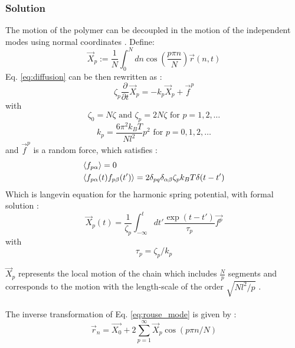 \documentclass[
    paper=A4,pagesize=automedia,fontsize=12pt,
    BCOR=15mm,DIV=22,
    twoside,headinclude,footinclude=false,
    ngerman,fleqn,             %
    bibliography=totocnumbered,          %
    listof=totoc,                %
    listof=flat,                 %
    cleardoublepage=empty      %
    numbers=endperiod
]{scrartcl}
\begin{document}
\subsubsection{Solution}
The motion of the polymer can be decoupled in the motion of the independent modes using normal
coordinates \cite{Doi_Edwards_PD:1994}. Define:
\begin{equation}
    \label{eq:rouse_mode}
    \vec{X}_p := \frac{1}{N} \int_0^N dn \cos(\frac{p \pi n}{N})\vec{r}(n, t)
\end{equation}
Eq. \ref{eq:diffusion} can be then rewritten as \cite{Doi_Edwards_PD:1994}:
\begin{equation}
    \zeta_p \frac{\partial}{\partial t} \vec{X}_p = -k_p \vec{X}_p + \vec{f}^p
\end{equation}
with 
\begin{equation}
    \zeta_0 = N \zeta
    \text{ and }
    \zeta_p = 2 N \zeta
    \text{ for } p = 1,2,\ldots
\end{equation}
\begin{equation}
    k_p = \frac{6 \pi^2 k_B T}{Nl^2} p^2
    \text{ for } p = 0,1,2,\ldots
\end{equation}
and $\vec{f}^p$ is a random force, which satisfies \cite{Doi_Edwards_PD:1994}:
\begin{equation}
    \begin{aligned}
        & \langle f_{p\alpha}\rangle = 0\\
        & \langle f_{p\alpha}(t) f_{p\beta}(t')\rangle = 2 \delta_{pq} \delta_{\alpha\beta} \zeta_p k_B T \delta(t-t')
    \end{aligned}
\end{equation}
Which is langevin equation for the harmonic spring potential, with formal solution \cite{Doi_Edwards_PD:1994}:
\begin{equation}
    \vec{X}_p(t) = \frac{1}{\zeta_p} \int_{-\infty}^{t} dt' \frac{\exp(t-t')}{\tau_p} \vec{f^p}
\end{equation}
with
\begin{equation}
    \tau_p = \zeta_p / k_p
\end{equation}

$\vec{X}_p$ represents the local motion of the chain which includes $\frac{N}{p}$ segments and corresponds to the
motion with the length-scale of the order $\sqrt{Nl^2/p}$ \cite{Doi_Edwards_PD:1994}.
\\
\\
The inverse transformation of Eq. \ref{eq:rouse_mode} is given by \cite{Doi_Edwards_PD:1994}:
\begin{equation}
    \vec{r}_n = \vec{X_0} + 2 \sum_{p=1}^{\infty} \vec{X}_p \cos(p \pi n  / N)
\end{equation}
\end{document}
